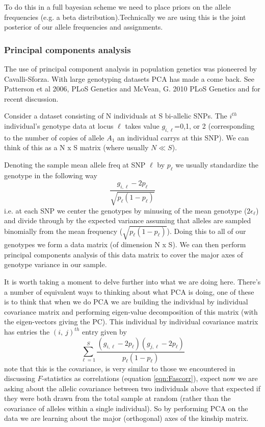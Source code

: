 To do this in a full bayesian scheme we need to place priors on the
allele frequencies (e.g. a beta distribution).Technically we are using
this is the joint posterior of our allele frequencies and assignments. 

\subsubsection{Principal components analysis}
The use of principal component analysis in population genetics was
pioneered by Cavalli-Sforza. With large genotyping datasets PCA has made
a come back. See Patterson et al 2006, PLoS Genetics and McVean,
G. 2010 PLoS Genetics and for recent discussion.
 
Consider a dataset consisting of N individuals at S bi-allelic
SNPs. The $i^{th}$ individual's genotype data at locus $\ell$ takes
value $g_{i,\ell}$=0,1, or 2 (corresponding to the number of copies of
allele $A_1$ an individual carrys at this SNP). We can think of this
as a N x S matrix (where usually $N \ll S$). 

 Denoting the sample mean allele freq at SNP $\ell$ by $p_{\ell}$ we usually standardize the genotype in the following way
\begin{equation}
\frac{g_{i,\ell} - 2 p_{\ell}}{\sqrt{p_{\ell}(1-p_{\ell})}}
\end{equation}
i.e. at each SNP we center the genotypes by minusing of the mean
genotype ($2\epsilon_{\ell}$) and divide through by the expected
variance assuming that alleles are sampled binomially from the mean
frequency ($\sqrt{p_{\ell} (1-p_{\ell})}$). Doing this to
all of our genotypes we form a data matrix (of dimension N x S). We
can then perform principal components analysis of this data matrix to
cover the major axes of genotype variance in our sample.

It is worth taking a moment to delve further into what we are doing
here. There's a number of equivalent ways to thinking about what PCA
is doing, one of these is to think that when we do PCA we are building the individual by individual
covariance matrix and performing eigen-value decomposition of this
matrix (with the eigen-vectors giving the PC).  This individual by individual covariance matrix has entries
the $(i,~j)^{th}$ entry given by
\begin{equation}
\sum_{\ell=1}^S \frac{(g_{i,\ell} - 2p_{\ell})(g_{j,\ell} - 2p_{\ell})}{p_{\ell}(1-p_{\ell})}
\end{equation}
note that this is the covariance, is very similar to those we
encountered in discussing $F$-statistics as correlations (equation
\eqref{eqn:Fascorr}), expect now we are asking about the allelic covariance
between two individuals above that expected if they were both drawn
from the total sample at random (rather than the covariance of alleles
within a single individual). So by performing PCA on the data we are
learning about the major (orthogonal) axes of the kinship matrix.    

\newpage

